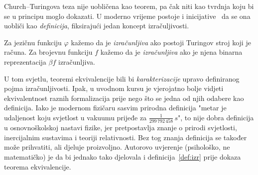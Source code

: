 Church--\!Turingova teza nije uobličena kao teorem, pa čak niti kao tvrdnja koju bi se u principu moglo dokazati. U moderno vrijeme postoje i inicijative~\cite{soare} da se ona uobliči kao \emph{definicija}, fiksirajući jedan koncept izračuljivosti.

\begin{definicija}\label{def:izr}
Za jezičnu funkciju $\varphi$ kažemo da je \emph{izračunljiva} ako postoji Turingov stroj koji je računa.
Za brojevnu funkciju $f$ kažemo da je \emph{izračunljiva} ako je njena binarna reprezentacija $\beta f$ izračunljiva.
\end{definicija}

U tom svjetlu, teoremi ekvivalencije bili bi \emph{karakterizacije} upravo definiranog pojma izračunljivosti. Ipak, u uvodnom kursu je vjerojatno bolje vidjeti ekvivalentnost raznih formalizacija prije nego što se jedna od njih odabere kao definicija. Iako je modernom fizičaru sasvim prirodna definicija "metar je udaljenost koju svjetlost u vakuumu prijeđe za $\frac{1}{299\,792\,458}\,s$", to nije dobra definicija u osnovnoškolskoj nastavi fizike, jer pretpostavlja znanje o prirodi svjetlosti, inercijalnim sustavima i teoriji relativnosti. Bez tog znanja definicija se također može prihvatiti, ali djeluje proizvoljno. Autorovo uvjerenje (psihološko, ne matematičko) je da bi jednako tako djelovala i definicija~\ref{def:izr} prije dokaza teorema ekvivalencije.


